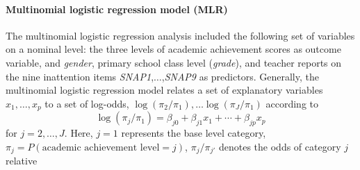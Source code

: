 \documentclass[10pt,letterpaper]{article}
\begin{document}
\paragraph{Multinomial logistic regression model (MLR)}
The multinomial logistic regression analysis included the following set of variables on a nominal level: the three levels of academic achievement scores as outcome variable, and 
 {\it gender}, primary school class level ({\it grade}), and  teacher reports on the nine inattention items {\it SNAP1},$\ldots$,{\it SNAP9} as predictors. 
Generally, the multinomial logistic regression model relates a set of explanatory variables $x_1, \ldots, x_p$ to a set of log-odds, $\log(\pi_2/\pi_1), \ldots \log(\pi_J/\pi_1)$ according to
\begin{equation}
\label{eq_MLR}
\log(\pi_j/\pi_1) = \beta_{j0} + \beta_{j1} x_1 + \cdots + \beta_{jp} x_p
\end{equation}
for $j=2,\ldots,J$. Here, $j = 1$ represents the base level category, $\pi_j = P(\mbox{academic achievement level} = j)$, $\pi_j/\pi_{j'}$ denotes the odds of category $j$ relative 
\end{document}
